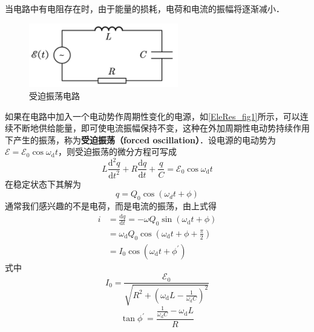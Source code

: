 

当电路中有电阻存在时，由于能量的损耗，电荷和电流的振幅将逐渐减小．
\begin{figure}[ht]
\centering
\includegraphics[width=6.5cm]{./figures/EleRes_1.pdf}
\caption{受迫振荡电路} \label{EleRes_fig1}
\end{figure}
如果在电路中加入一个电动势作周期性变化的电源，如\autoref{EleRes_fig1}所示，可以连续不断地供给能量，即可使电流振幅保持不变，这种在外加周期性电动势持续作用下产生的振荡，称为\textbf{受迫振荡（forced oscillation）}．设电源的电动势为$\mathscr{E}=\mathscr{E}_{0} \cos \omega_{\mathrm{d}} t$，则受迫振荡的微分方程可写成
\begin{equation}
L \frac{\mathrm{d}^{2} q}{\mathrm{d} t^{2}}+R \frac{\mathrm{d} q}{\mathrm{d} t}+\frac{q}{C}=\mathscr{E}_{0} \cos \omega_{\mathrm{d}} t
\end{equation}
在稳定状态下其解为
\begin{equation}
q=Q_{0} \cos \left(\omega_{d} t+\phi\right)
\end{equation}
通常我们感兴趣的不是电荷，而是电流的振荡，由上式得
\begin{equation}
\begin{aligned}i&=\frac{\mathrm{d} q}{\mathrm{d} t}=-\omega Q_{0} \sin \left(\omega_{\mathrm{d}} t+\phi\right) \\ &=\omega_{\mathrm{d}} Q_{0} \cos \left(\omega_{\mathrm{d}} t+\phi+\frac{\pi}{2}\right) \\ &=I_{0} \cos \left(\omega_{\mathrm{d}} t+\phi^{\prime}\right)\end{aligned}
\end{equation}
式中
\begin{equation} \label{EleRes_eq1}
I_{0}=\frac{\mathscr{E}_{0}}{\sqrt{R^{2}+\left(\omega_{\mathrm{d}} L-\frac{1}{\omega_{\mathrm{d}} C}\right)^{2}}}
\end{equation}
\begin{equation} \label{EleRes_eq2}
\tan \phi^{\prime}=\frac{\frac{1}{\omega_{\mathrm{d}} C}-\omega_{\mathrm{d}} L}{R}
\end{equation}

